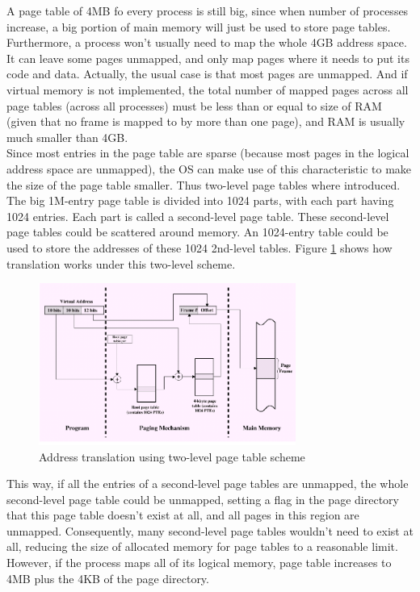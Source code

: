 \documentclass[]{scrartcl}
\begin{document}
A page table of 4MB fo every process is still big, since when
number of processes increase, a big portion of main memory will
just be used to store page tables. Furthermore, a process
won't usually need to map the whole 4GB address space. It can leave
some pages unmapped, and only map pages where it needs to put
its code and data. Actually, the usual case is that most pages are 
unmapped. And if virtual memory is not implemented, the total
number of mapped pages across all page tables (across all processes)
must be less than or equal to size of RAM (given that no frame
is mapped to by more than one page), and RAM is usually
much smaller than 4GB.\\

Since most entries in the page table are sparse (because most pages
in the logical address space are unmapped), the OS can make use
of this characteristic to make the size of the page table smaller.
Thus two-level page tables where introduced. The big 1M-entry page 
table is divided into 1024 parts, with each part having 1024 entries.
Each part is called a second-level page table. These second-level
page tables could be scattered around memory. An 1024-entry table
could be used to store the addresses of these 1024 2nd-level tables.
Figure \ref{pagetable2} shows how translation works under this
two-level scheme.

\begin{figure}[H]
\begin{center}
\includegraphics[width=0.75\textwidth]{pagetable2.png}
\end{center}
\caption{Address translation using two-level page table scheme}
\label{pagetable2}
\end{figure}

This way, if all the entries of a second-level page tables are
unmapped, the whole second-level page table could be unmapped,
setting a flag in the page directory that this page table
doesn't exist at all, and all pages in this region are unmapped.
Consequently, many second-level page tables wouldn't need to
exist at all, reducing the size of allocated memory for page
tables to a reasonable limit. However, if the process maps
all of its logical memory, page table increases to 4MB plus
the 4KB of the page directory. \\
\end{document}
